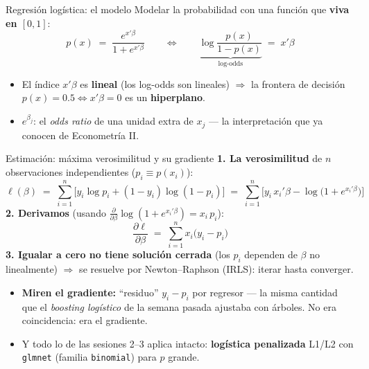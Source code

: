 \documentclass{beamer}
\newcommand{\1}{\mathbb{I}}
\begin{document}
\begin{frame}{Regresión logística: el modelo}
\small
Modelar la probabilidad con una función que \textbf{viva en $[0,1]$}:
\[ p(x) \;=\; \frac{e^{x'\beta}}{1 + e^{x'\beta}} \qquad \Longleftrightarrow \qquad \underbrace{\log \frac{p(x)}{1 - p(x)}}_{\text{log-odds}} \;=\; x'\beta \]

\vspace{0.1cm}
\begin{center}
\end{center}
\pause

\begin{itemize}\itemsep3pt
  \item El índice $x'\beta$ es \textbf{lineal} (los log-odds son lineales) $\Rightarrow$ la frontera de decisión $p(x) = 0.5 \iff x'\beta = 0$ es un \textbf{hiperplano}.
  \item $e^{\beta_j}$: el \emph{odds ratio} de una unidad extra de $x_j$ --- la interpretación que ya conocen de Econometría II.
\end{itemize}
\end{frame}

\begin{frame}{Estimación: máxima verosimilitud y su gradiente}
\small
\textbf{1. La verosimilitud} de $n$ observaciones independientes ($p_i \equiv p(x_i)$):
\[ \ell(\beta) \;=\; \sum_{i=1}^{n} \Big[ y_i \log p_i + (1 - y_i)\log(1 - p_i) \Big] \;=\; \sum_{i=1}^{n} \Big[ y_i\, x_i'\beta - \log\big(1 + e^{x_i'\beta}\big) \Big] \]
\pause
\textbf{2. Derivamos} (usando $\frac{\partial}{\partial \beta} \log(1 + e^{x_i'\beta}) = x_i\, p_i$):
\[ \frac{\partial \ell}{\partial \beta} \;=\; \sum_{i=1}^{n} x_i \big( y_i - p_i \big) \]
\pause
\textbf{3. Igualar a cero no tiene solución cerrada} (los $p_i$ dependen de $\beta$ no linealmente) $\Rightarrow$ se resuelve por Newton--Raphson (IRLS): iterar hasta converger.
\pause

\vspace{0.15cm}
\begin{itemize}\itemsep4pt
  \item \textbf{Miren el gradiente:} ``residuo'' $y_i - p_i$ por regresor --- la misma cantidad que el \emph{boosting logístico} de la semana pasada ajustaba con árboles. No era coincidencia: era el gradiente.
  \item Y todo lo de las sesiones 2--3 aplica intacto: \textbf{logística penalizada} L1/L2 con \texttt{glmnet} (familia \texttt{binomial}) para $p$ grande.
\end{itemize}
\end{frame}
\end{document}
